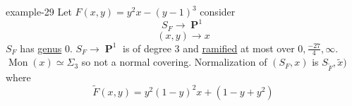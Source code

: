 \documentclass[10pt,]{book}
\numberwithin{equation}{section}
\DeclareMathOperator{\PP}{\mathbf{P}}
\begin{document}
\begin{example}{}{example-29}%
\hypertarget{p-596}{}%
Let \(F(x,y) = y^2x - (y-1)^3\) consider%
\begin{equation*}
S_F \to \PP^1
\end{equation*}
%
\begin{equation*}
(x,y) \to x
\end{equation*}
\(S_F\) has \hyperref[fact-existance-genus]{genus} 0. \(S_F \to \PP^1\) is of degree 3 and \hyperref[def-dess-ramified]{ramified} at most over \(0, \frac{-27}{4}, \infty\). \(\operatorname{Mon}(x)  \simeq \Sigma_3\) so not a normal covering. Normalization of \((S_F, x)\) is \(S_{\tilde F} , \tilde x)\) where%
\begin{equation*}
\tilde F (x,y) = y^2 ( 1-y)^2 x +  (1-y + y^2)
\end{equation*}
%
\end{example}
%
%
\typeout{************************************************}
\typeout{************************************************}
%
\end{document}
